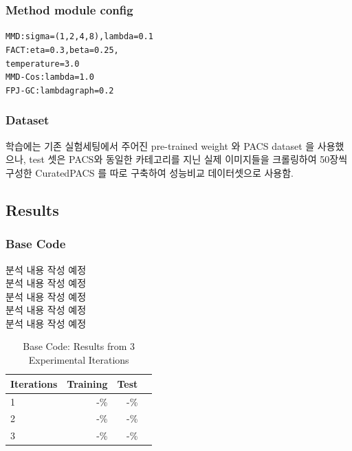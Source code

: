 \subsubsection{Method module config}
\begin{alltt}
MMD : sigma = (1, 2, 4, 8), lambda = 0.1
FACT : eta = 0.3, beta = 0.25, 
       temperature= 3.0 
MMD-Cos : lambda = 1.0
FPJ-GC : lambda graph = 0.2
\end{alltt}

\subsubsection{Dataset}
학습에는 기존 실험세팅에서 주어진 pre-trained weight 와 PACS dataset 을 사용했으나, test 셋은 PACS와 
동일한 카테고리를 지닌 실제 이미지들을 크롤링하여 50장씩 구성한 CuratedPACS 를 따로 구축하여 
성능비교 데이터셋으로 사용함. 

\subsection{Results}
\subsubsection{Base Code}
분석 내용 작성 예정\\
분석 내용 작성 예정\\
분석 내용 작성 예정\\
분석 내용 작성 예정\\
분석 내용 작성 예정\\
\begin{table}[h]
  \centering
  \begin{tabular}{lrrr}
  \toprule
  Iterations & Training & Test \\
  \midrule
  1 & -\% & -\% \\
  2 & -\% & -\% \\
  3 & -\% & -\% \\
  \bottomrule
  \end{tabular}
  \caption{Base Code: Results from 3 Experimental Iterations}
  \label{tab:Base Code: Results from 3 Experimental Iterations}
\end{table}

